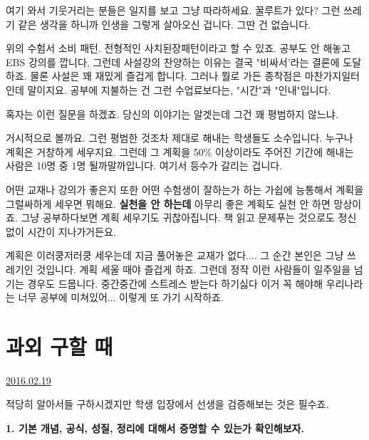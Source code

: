여기 와서 기웃거리는 분들은 일지를 보고 그냥 따라하세요.
꿀루트가 있다? 그런 쓰레기 같은 생각을 하니까 인생을 그렇게 살아오신 겁니다. 그딴 건 없습니다.
\vspace{5mm}

위의 수험서 소비 패턴.
전형적인 사치된장패턴이라고 할 수 있죠.
공부도 안 해놓고 EBS 강의를 깝니다, 그런데 사설강의 찬양하는 이유는 결국 "비싸서'라는 결론에 도달하죠.
물론 사설은 꽤 재밌게 즐겁게 합니다. 그러나 뭘로 가든 종착점은 마찬가지일터인데 말이지요.
공부에 지불하는 건 그런 수업료보다는, "시간"과 "인내"입니다.
\vspace{5mm}

혹자는 이런 질문을 하겠죠. 당신의 이야기는 알겟는데 그건 꽤 평범하지 않느냐.
\vspace{5mm}

거시적으로 볼까요. 그런 평범한 것조차 제대로 해내는 학생들도 소수입니다.
누구나 계획은 거창하게 세우지요. 그런데 그 계획을 50$\%$ 이상이라도 주어진 기간에 해내는 사람은 10명 중 1명 될까말까입니다.
여기서 등수가 갈리는 겁니다.
\vspace{5mm}

어떤 교재나 강의가 좋은지 또한 어떤 수험생이 잘하는가 하는 가쉽에 능통해서 계획을 그럴싸하게 세우면 뭐해요.
\textbf{실천을 안 하는데}
아무리 좋은 계획도 실천 안 하면 망상이죠.
그냥 공부하다보면 계획 세우기도 귀찮아집니다. 책 읽고 문제푸는 것으로도 정신없이 시간이 지나가거든요.
\vspace{5mm}

계획은 이러쿵저러쿵 세우는데 지금 풀어놓은 교재가 없다.... 그 순간 본인은 그냥 쓰레기인 것입니다.
계획 세울 때야 즐겁게 하죠. 그런데 정작 이런 사람들이 일주일을 넘기는 경우도 드뭅니다.
중간중간에 스트레스 받는다 하기싫다 이거 꼭 해야해 우리나라는 너무 공부에 미쳐있어... 이렇게 또 가기 시작하죠.
\vspace{5mm}






\section{과외 구할 때}
\href{https://www.kockoc.com/Apoc/641984}{2016.02.19}

\vspace{5mm}

적당히 알아서들 구하시겠지만 학생 입장에서 선생을 검증해보는 것은 필수죠.
\vspace{5mm}

\item \textbf{1. 기본 개념, 공식, 성질, 정리에 대해서 증명할 수 있는가 확인해보자.}
\vspace{5mm}

